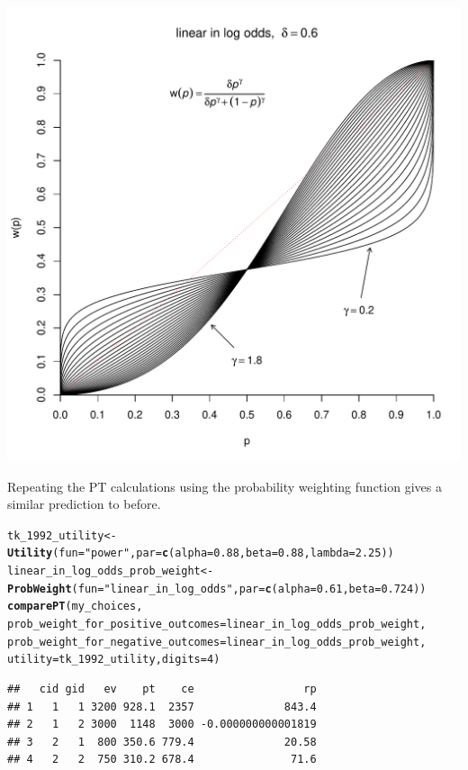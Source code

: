 \documentclass{article}\usepackage[]{graphicx}\usepackage[]{color}
\makeatletter
\def\maxwidth{ %
  \ifdim\Gin@nat@width>\linewidth
    \linewidth
  \else
    \Gin@nat@width
  \fi
}
\newcommand{\hlnum}[1]{\textcolor[rgb]{0.686,0.059,0.569}{#1}}%
\newcommand{\hlstr}[1]{\textcolor[rgb]{0.192,0.494,0.8}{#1}}%
\newcommand{\hlstd}[1]{\textcolor[rgb]{0.345,0.345,0.345}{#1}}%
\newcommand{\hlkwb}[1]{\textcolor[rgb]{0.69,0.353,0.396}{#1}}%
\newcommand{\hlkwc}[1]{\textcolor[rgb]{0.333,0.667,0.333}{#1}}%
\newcommand{\hlkwd}[1]{\textcolor[rgb]{0.737,0.353,0.396}{\textbf{#1}}}%
\newenvironment{kframe}{%
 \def\at@end@of@kframe{}%
 \ifinner\ifhmode%
  \def\at@end@of@kframe{\end{minipage}}%
  \begin{minipage}{\columnwidth}%
 \fi\fi%
 \def\FrameCommand##1{\hskip\@totalleftmargin \hskip-\fboxsep
 \colorbox{shadecolor}{##1}\hskip-\fboxsep
     \hskip-\linewidth \hskip-\@totalleftmargin \hskip\columnwidth}%
 \MakeFramed {\advance\hsize-\width
   \@totalleftmargin\z@ \linewidth\hsize
   \@setminipage}}%
 {\par\unskip\endMakeFramed%
 \at@end@of@kframe}
\newenvironment{knitrout}{}{} %
\makeatother
\begin{document}
\begin{knitrout}
{\centering \includegraphics[width=\maxwidth]{figure/unnamed-chunk-23} 

}



\end{knitrout}


Repeating the PT calculations using the \cite{Gonzalez_Wu_1999} probability weighting function gives a similar prediction to before.

\begin{knitrout}
\color{fgcolor}\begin{kframe}
\begin{alltt}
\hlstd{tk_1992_utility} \hlkwb{<-} \hlkwd{Utility}\hlstd{(}\hlkwc{fun}\hlstd{=}\hlstr{"power"}\hlstd{,} \hlkwc{par}\hlstd{=}\hlkwd{c}\hlstd{(}\hlkwc{alpha}\hlstd{=}\hlnum{0.88}\hlstd{,} \hlkwc{beta}\hlstd{=}\hlnum{0.88}\hlstd{,} \hlkwc{lambda}\hlstd{=}\hlnum{2.25}\hlstd{))}
\hlstd{linear_in_log_odds_prob_weight} \hlkwb{<-} \hlkwd{ProbWeight}\hlstd{(}\hlkwc{fun}\hlstd{=}\hlstr{"linear_in_log_odds"}\hlstd{,} \hlkwc{par}\hlstd{=}\hlkwd{c}\hlstd{(}\hlkwc{alpha}\hlstd{=}\hlnum{0.61}\hlstd{,} \hlkwc{beta}\hlstd{=}\hlnum{0.724}\hlstd{))}
\hlkwd{comparePT}\hlstd{(my_choices,}
        \hlkwc{prob_weight_for_positive_outcomes}\hlstd{=linear_in_log_odds_prob_weight,}
        \hlkwc{prob_weight_for_negative_outcomes}\hlstd{=linear_in_log_odds_prob_weight,}
        \hlkwc{utility}\hlstd{=tk_1992_utility,} \hlkwc{digits}\hlstd{=}\hlnum{4}\hlstd{)}
\end{alltt}
\begin{verbatim}
##   cid gid   ev    pt    ce                 rp
## 1   1   1 3200 928.1  2357              843.4
## 2   1   2 3000  1148  3000 -0.000000000001819
## 3   2   1  800 350.6 779.4              20.58
## 4   2   2  750 310.2 678.4               71.6
\end{verbatim}
\end{kframe}
\end{knitrout}
\end{document}
